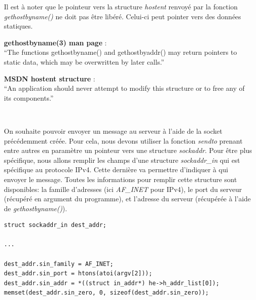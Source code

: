 \begin{mdframed}[backgroundcolor=lightblue2, linecolor=darkblue]
Il est à noter que le pointeur vers la structure \emph{hostent} renvoyé par la fonction \emph{gethostbyname()} ne doit pas être libéré. Celui-ci peut pointer vers des données statiques.

\begin{mdframed}[backgroundcolor=lightblue, linecolor=darkblue]
	\textbf{gethostbyname(3) man page} :\\ %
	``The functions gethostbyname() and gethostbyaddr() may  return  pointers to  static  data, which may be overwritten by later calls.''
\end{mdframed}
\begin{mdframed}[backgroundcolor=lightblue, linecolor=darkblue]
	\noindent\textbf{MSDN hostent structure} :\\ %
	``An application should never attempt to modify this structure or to free any of its components.''
\end{mdframed}
\end{mdframed}
\

On souhaite pouvoir envoyer un message au serveur à l'aide de la socket précédemment créée. Pour cela, nous devons utiliser la fonction \emph{sendto} prenant entre autres en paramètre un pointeur vers une structure \emph{sockaddr}. Pour être plus spécifique, nous allons remplir les champs d'une structure \emph{sockaddr\_in} qui est spécifique au protocole IPv4. Cette dernière va permettre d'indiquer à qui envoyer le message. Toutes les informations pour remplir cette structure sont disponibles: la famille d'adresses (ici \emph{AF\_INET} pour IPv4), le port du serveur (récupéré en argument du programme), et l'adresse du serveur (récupérée à l'aide de \emph{gethostbyname()}).

\begin{lstlisting}
struct sockaddr_in dest_addr;

...

dest_addr.sin_family = AF_INET;
dest_addr.sin_port = htons(atoi(argv[2]));
dest_addr.sin_addr = *((struct in_addr*) he->h_addr_list[0]);
memset(dest_addr.sin_zero, 0, sizeof(dest_addr.sin_zero));
\end{lstlisting}
\

